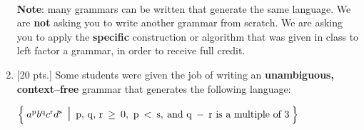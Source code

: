 \documentclass[11pt]{article}
\begin{document}
\begin{enumerate}
\begin{center}
\begin{grammar}
                \\

            \end{grammar}

          \end{center}

          \vspace{-3mm}

          \textbf{Note}: many grammars can be written that generate the same
          language.  We are \textbf{not} asking you to write another grammar
          from scratch.  We are asking you to apply the \textbf{specific}
          construction or algorithm that was given in class to left factor a
          grammar, in order to receive full credit.

          \vspace{4in}

          \underline{\hspace{\linewidth}}

          \medskip

          \begin{centering}

            \scratchpaper[6.8in]

          \end{centering}

          \pagebreak


    \item {[20 pts.]} Some students were given the job of writing an
          \textbf{unambiguous, context--free} grammar that generates the
          following language:

          \vspace{-3.75mm}

          \begin{center}

            \(
              \left\{
                \:
                {a^\mathrm{p}}{b^\mathrm{q}}{c^\mathrm{r}}{d^\mathrm{s}}
                \mbox{\Large \ensuremath{\ \mid \ }}
                \mathrm{p, \, q, \, r \: \ge \: 0, \ p \: < \: s,
                        \: and \ q \: - \: r \ \textrm{is a multiple of 3}
                }
                \:
              \right\}
            \)

          \end{center}


\end{enumerate}
\end{document}
